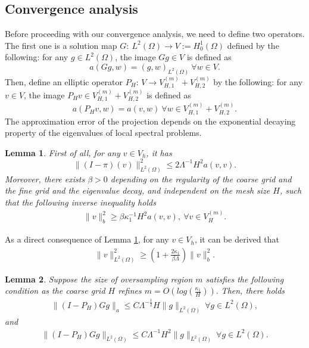 \documentclass[preprint,12pt]{elsarticle}
\newtheorem{lemma}{Lemma}
\begin{document}
\subsection{Convergence analysis}
Before proceeding with our convergence analysis, we need to define two operators. The first one is a solution map $G:~L^2(\Omega)\rightarrow{V:=H^1_0(\Omega)}$ defined by the following: for any $g\in L^2(\Omega)$, the image $Gg\in V$ is defined as
$$a(Gg,w)=(g,w)_{L^2(\Omega)}~\forall w\in V.$$
Then, define an elliptic operator $P_H$: $V\rightarrow{V_{H,1}^{(m)}+V_{H,2}^{(m)}}$ by the following: for any $v\in V$, the image $P_Hv\in V_{H,1}^{(m)}+V_{H,2}^{(m)}$ is defined as 
$$a(P_Hv,w)=a(v,w)~\forall w\in V_{H,1}^{(m)}+V_{H,2}^{(m)}.$$ 
The approximation error of the projection depends on the exponential decaying property of the eigenvalues of local spectral problems.
\begin{lemma}\label{cem}
    First of all, for any $v\in V_h$, it has $$\|(I-\pi)(v)\|_{L^2(\Omega)}^2\leq2\Lambda^{-1}H^2a(v,v).$$ Moreover, there exists $\beta>0$ depending on the regularity of the coarse grid and the fine grid and the eigenvalue decay, and independent on the mesh size $H$,  such that the following inverse inequality holds
\begin{equation}\label{L.cem1}
\begin{aligned}
     \|v\|_b^2\geq \beta\kappa_1^{-1}H^2a(v,v),~\forall v\in V_H^{(m)}.
\end{aligned}
\end{equation}
\end{lemma}
As a direct consequence of Lemma \ref{cem}, for any $v\in V_h$, it can be derived that
\begin{equation}\label{L.cem2}
\begin{aligned}
     \|v\|_{L^2(\Omega)}^2\geq \left(1+\frac{2\kappa_1}{\beta\Lambda}\right)\|v\|^2_{b}.
\end{aligned}
\end{equation}


\begin{lemma}
    Suppose the size of oversampling region $m$ satisfies the following condition as the coarse grid $H$ refines $m=O\left(log\left(\frac{\kappa_1}{H}\right)\right).$ Then, there holds
\begin{equation}\label{L.1}
\begin{aligned}
     \|(I-P_H)Gg\|_a\leq C\Lambda^{-\frac{1}{2}}H\|g\|_{L^2(\Omega)}~\forall g\in L^2(\Omega),
\end{aligned}
\end{equation}
and
\begin{equation}\label{L.2}
\begin{aligned}
     \|(I-P_H)Gg\|_{L^2(\Omega)}\leq C\Lambda^{-1}H^2\|g\|_{L^2(\Omega)}~\forall g\in L^2(\Omega).
\end{aligned}
\end{equation}
\end{lemma}
\end{document}

